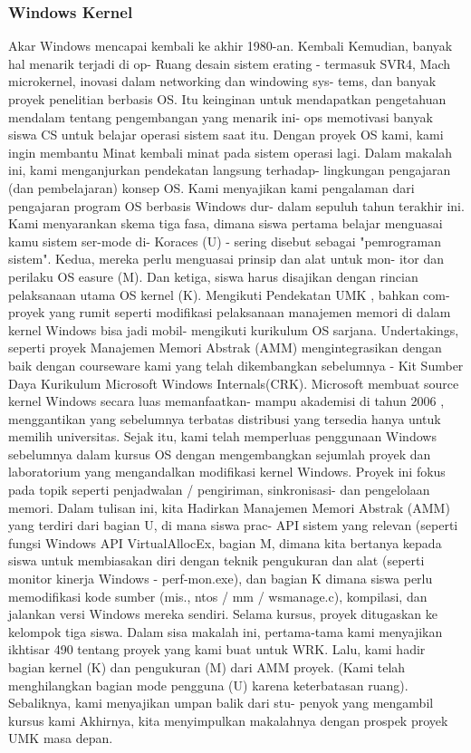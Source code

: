 \subsubsection{Windows Kernel}
 Akar Windows mencapai kembali ke akhir 1980-an. Kembali
 Kemudian, banyak hal menarik terjadi di op-
 Ruang desain sistem erating - termasuk SVR4, Mach
 microkernel, inovasi dalam networking dan windowing sys-
 tems, dan banyak proyek penelitian berbasis OS. Itu
 keinginan untuk mendapatkan pengetahuan mendalam tentang pengembangan yang menarik ini-
 ops memotivasi banyak siswa CS untuk belajar operasi
 sistem saat itu. Dengan proyek OS kami, kami ingin membantu
 Minat kembali minat pada sistem operasi lagi.
 Dalam makalah ini, kami menganjurkan pendekatan langsung terhadap-
 lingkungan pengajaran (dan pembelajaran) konsep OS. Kami menyajikan kami
 pengalaman dari pengajaran program OS berbasis Windows dur-
 dalam sepuluh tahun terakhir ini. Kami menyarankan skema tiga fasa,
 dimana siswa pertama belajar menguasai
 kamu
 sistem ser-mode di-
 Koraces (U) - sering disebut sebagai "pemrograman sistem".
 Kedua, mereka perlu menguasai prinsip dan alat untuk mon-
 itor dan perilaku OS easure (M). Dan ketiga, siswa
 harus disajikan dengan rincian pelaksanaan utama OS
 kernel (K). Mengikuti Pendekatan UMK , bahkan com-
 proyek yang rumit seperti modifikasi pelaksanaan
 manajemen memori di dalam kernel Windows bisa jadi mobil-
 mengikuti kurikulum OS sarjana. Undertakings,
 seperti proyek Manajemen Memori Abstrak (AMM)
 mengintegrasikan dengan baik dengan courseware kami yang telah dikembangkan sebelumnya -
 Kit Sumber Daya Kurikulum Microsoft Windows Internals(CRK).
 Microsoft membuat source kernel Windows secara luas memanfaatkan-
 mampu akademisi di tahun 2006 , menggantikan yang sebelumnya terbatas
 distribusi yang tersedia hanya untuk memilih universitas.
 Sejak itu, kami telah memperluas penggunaan Windows sebelumnya
 dalam kursus OS dengan mengembangkan sejumlah proyek dan laboratorium
 yang mengandalkan modifikasi kernel Windows. Proyek ini
 fokus pada topik seperti penjadwalan / pengiriman, sinkronisasi-
 dan pengelolaan memori. Dalam tulisan ini, kita
 Hadirkan Manajemen Memori Abstrak (AMM)
 yang terdiri dari bagian U, di mana siswa prac-
 API sistem yang relevan (seperti fungsi Windows API
 VirtualAllocEx, bagian M, dimana kita bertanya kepada siswa
 untuk membiasakan diri dengan teknik pengukuran dan
 alat (seperti monitor kinerja Windows - perf-mon.exe), dan bagian K	dimana siswa perlu memodifikasi
 kode sumber (mis., ntos / mm / wsmanage.c), kompilasi, dan jalankan
 versi Windows mereka sendiri. Selama kursus, proyek
 ditugaskan ke kelompok tiga siswa.
 Dalam sisa makalah ini, pertama-tama kami menyajikan ikhtisar 490
 tentang proyek yang kami buat untuk WRK. Lalu, kami hadir
 bagian kernel (K) dan pengukuran (M) dari AMM
 proyek. (Kami telah menghilangkan bagian mode pengguna (U) karena
 keterbatasan ruang). Sebaliknya, kami menyajikan umpan balik dari stu-
 penyok yang mengambil kursus kami Akhirnya, kita menyimpulkan makalahnya
 dengan prospek proyek UMK masa depan.
	

